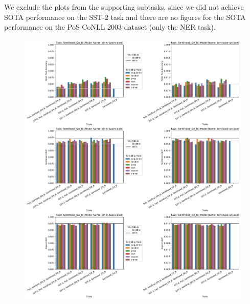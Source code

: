 \documentclass[11pt]{report}
\theoremstyle{Definition}
\theoremstyle{remark}
\begin{document}
We exclude the plots from the supporting subtasks, since we did not achieve SOTA performance on the SST-2 task and there are no figures for the SOTA performance on the PoS CoNLL 2003 dataset (only the NER task). 
\begin{figure}
	\includegraphics[width=\textwidth]{SentihoodResults.pdf}
	\label{fig:experiments:sentihoodresults}
\end{figure}
\end{document}
